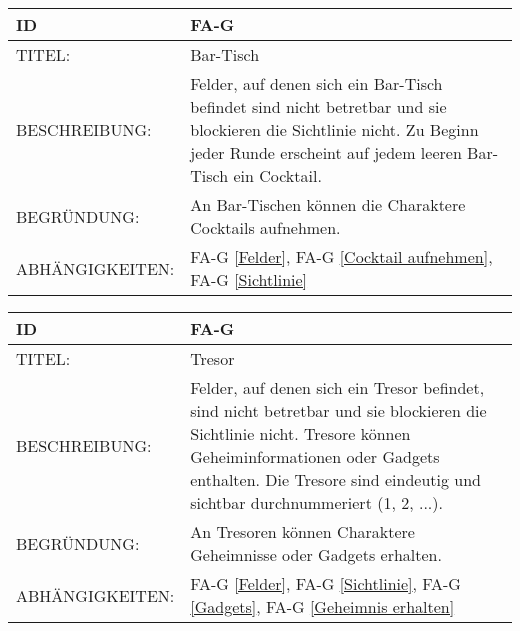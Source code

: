 \begin{tabularx}{16cm}{l|X}
	{table}\label{Bar-Tisch}
	\textbf{ID} & \textbf{FA-G \arabic{table}} \\
	\hline
	TITEL: & Bar-Tisch \\
	\hline
	BESCHREIBUNG: & Felder, auf denen sich ein Bar-Tisch befindet sind nicht betretbar und sie blockieren die Sichtlinie nicht. Zu Beginn jeder Runde erscheint auf jedem leeren Bar-Tisch ein Cocktail. \\
	\hline
	BEGRÜNDUNG: & An Bar-Tischen können die Charaktere Cocktails aufnehmen. \\
	\hline
	ABHÄNGIGKEITEN: & FA-G \ref{Felder}, FA-G \ref{Cocktail aufnehmen}, FA-G \ref{Sichtlinie} \\
\end{tabularx}

\begin{tabularx}{16cm}{l|X}
	{table}\label{Tresor}
	\textbf{ID} & \textbf{FA-G \arabic{table}} \\
	\hline
	TITEL: & Tresor \\
	\hline
	BESCHREIBUNG: & Felder, auf denen sich ein Tresor befindet, sind nicht betretbar und sie blockieren die Sichtlinie nicht. Tresore können Geheiminformationen oder Gadgets enthalten. Die Tresore sind eindeutig und sichtbar durchnummeriert (1, 2, ...). \\
	\hline
	BEGRÜNDUNG: & An Tresoren können Charaktere Geheimnisse oder Gadgets erhalten. \\
	\hline
	ABHÄNGIGKEITEN: & FA-G \ref{Felder}, FA-G \ref{Sichtlinie}, FA-G \ref{Gadgets}, FA-G \ref{Geheimnis erhalten} \\
\end{tabularx}

